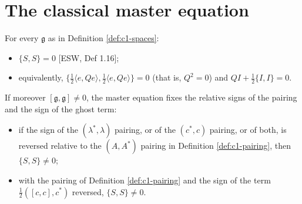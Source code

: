\section{The classical master equation}

\begin{proposition}
\label{prop:c1-cme}
For every $\mathfrak g$ as in Definition \ref{def:c1-spaces}:
\begin{itemize}
\item $\{S,S\}=0$ [ESW, Def 1.16];
\item equivalently, $\{\tfrac12\langle e,Qe\rangle,\tfrac12\langle e,Qe\rangle\}=0$ (that is, $Q^2=0$) and $QI+\tfrac12\{I,I\}=0$.
\end{itemize}
If moreover $[\mathfrak g,\mathfrak g]\neq0$, the master equation fixes the relative signs of the pairing and the sign of the ghost term:
\begin{itemize}
\item if the sign of the $(\lambda^*,\lambda)$ pairing, or of the $(c^*,c)$ pairing, or of both, is reversed relative to the $(A,A^*)$ pairing in Definition \ref{def:c1-pairing}, then $\{S,S\}\neq0$;
\item with the pairing of Definition \ref{def:c1-pairing} and the sign of the term $\tfrac12([c,c],c^*)$ reversed, $\{S,S\}\neq0$.
\end{itemize}
\end{proposition}

